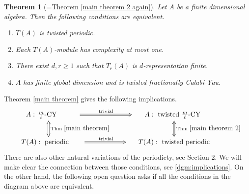 \documentclass[a4paper,reqno,11pt]{amsart}
\newtheorem{theorem}{Theorem}[section]
\theoremstyle{definition}
\numberwithin{equation}{section}
\begin{document}
\begin{theorem}[=Theorem \ref{main theorem 2 again}]\label{main theorem 2}
Let $A$ be a finite dimensional algebra. Then the following conditions are equivalent.
\begin{enumerate}[\rm(i)] 
\item $T(A)$ is twisted periodic.
\item Each $T(A)$-module has complexity at most one.
\item There exist $d,r\ge1$ such that $T_r(A)$ is $d$-representation finite.
\item $A$ has finite global dimension and is twisted fractionally Calabi-Yau.
\end{enumerate}
\end{theorem}




Theorem \ref{main theorem} gives the following implications.
\begin{align*}
\vcenter{
\xymatrix@C=60pt{
{\phantom{ed}A:\,\frac{m}{\ell}\text{-CY}\phantom{graddd}} \ar@{=>}[r]^{\text{trivial}\phantom{abcd}} \ar@{<=>}[d]^{\text{Thm }\ref{main theorem}} & {\quad\;\; A:\text{ twisted }\frac{m}{\ell}\text{-CY}\qquad} \ar@{<=>}[d]^{\text{Thm }\ref{main theorem 2}}\\
{\phantom{ed}T(A):\text{ periodic}\phantom{grad}}  \ar@{=>}[r]^{\text{trivial}\phantom{abcd}} & {\phantom{ged}T(A):\text{ twisted periodic}\phantom{rad}}
}}
\end{align*}
There are also other natural variations of the periodicty, see Section 2. We will make clear the connection between those conditions, see \eqref{dgm:implications}. On the other hand, the following open question asks if all the conditions in the diagram above are equivalent.
\end{document}
